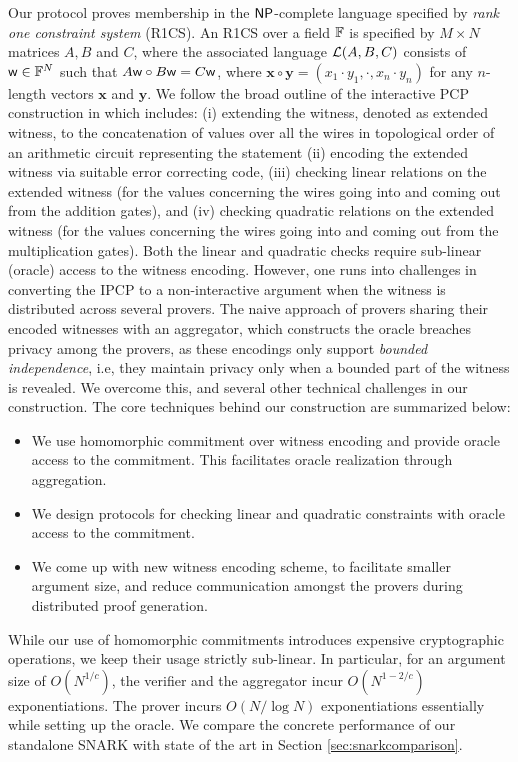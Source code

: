 Our protocol proves membership in the $\mathsf{NP}$-complete
language specified by {\em rank one constraint system} (R1CS). An R1CS over a
field $\mathbb{F}$ is specified by $M\times N$ matrices $A,B$ and $C$, where the
associated language $\mathcal{L}(A,B,C)$ consists of $\mathsf{w}\in \mathbb{F}^N$ such that
$A\mathsf{w}\circ B\mathsf{w}=C\mathsf{w}$, where $\bm{x} \circ \bm{y} = (x_1\cdot y_1, \cdot, x_n\cdot y_n)$ for any $n$-length vectors $\bm{x}$ and $\bm{y}$.  We follow the broad outline of the interactive PCP
construction in \cite{ligero} which includes: (i) extending the witness, denoted as extended witness, to the concatenation of values over all the wires in topological order of an arithmetic circuit  representing the statement   (ii) encoding the extended witness via suitable
error correcting code, (iii) checking linear relations on the extended witness (for the values concerning the wires going into and coming out from the addition gates), and
(iv) checking quadratic relations on
the extended witness  (for the values concerning the wires going into and coming out from the multiplication gates). Both the linear and quadratic checks require sub-linear (oracle) access to the 
witness encoding.
However, one runs into 
challenges in converting the IPCP to a non-interactive
argument when the witness is distributed across several provers. The naive
approach of provers sharing their encoded witnesses with an aggregator, which
constructs the oracle breaches privacy among the provers, as these encodings
only support {\em bounded independence}, i.e, they maintain privacy only when a
bounded part of the witness is revealed. We overcome this, and several other
technical challenges in our construction. The core techniques behind our
construction are summarized below:
\begin{itemize}
\item We use homomorphic commitment over witness encoding and provide oracle
access to the commitment. This facilitates oracle realization through
aggregation.
\item We design protocols for checking linear and quadratic constraints
with oracle access to the commitment.
\item We come up with new witness encoding scheme, to facilitate smaller
argument size, and reduce communication amongst the provers during distributed proof
generation.
\end{itemize}
While our use of homomorphic commitments introduces expensive cryptographic
operations, we keep their usage strictly sub-linear. In particular, for an
argument size of $O(N^{1/c})$, the verifier and  the aggregator incur $O(N^{1-2/c})$
exponentiations. The prover incurs $O(N/\log N)$ exponentiations essentially while
setting up the oracle. We compare the concrete performance of our standalone SNARK with state of the art in Section
\ref{sec:snarkcomparison}.
